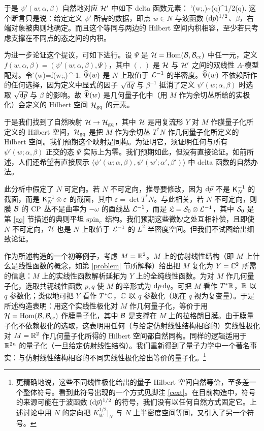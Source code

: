 于是 $\psi'(w;\alpha,\beta)$ 自然地对应 ${\mathcal H}'$ 中如下 delta 函数元素：
\be\label{wacko}\psi'(w;\alpha,\beta)\sim(\d\vec q)^{1/2}\delta(\vec q)\cdot\beta.\ee
这个断言只是说：给定定义 $\psi'$ 所需的数据，即点 $w\in N$ 与波函数 $({\mathrm d}\vec p)^{1/2}$、$\beta$，右端对象被典则地确定。而且这个等同与两边的 Hilbert 空间内积相容，至少若只考虑支撑在不同点的态之间的内积。

为进一步论证这个提议，可如下进行。设 $\Psi$ 是 ${\mathcal H}={\mathrm{Hom}}({\mathcal B},{\mathcal B}_{\mathrm{cc}})$ 中任一元，定义 $f(w,\alpha,\beta)=(\psi'(w;\alpha,\beta),\Psi)$，其中 $(\,,\,)$ 是 ${\mathcal H}$ 与 ${\mathcal H}'$ 之间的双线性 $A$-模型配对。令
\be\label{oko}\h\Psi(w)=f(w;\alpha,\beta)\,\beta^{-1}.\ee
$\widehat\Psi(w)$ 是 $N$ 上取值于 ${\mathcal L}^{-1}$ 的半密度。$\widehat\Psi(w)$ 不依赖所作的任何选择，因为定义中显式的因子 $\sqrt{{\mathrm d}\vec q}$ 与 $\beta^{-1}$ 抵消了定义 $\psi'(w;\alpha,\beta)$ 时选取 $\sqrt{{\mathrm d}\vec p}$ 与 $\beta$ 的影响。故 $\widehat\Psi(w)$ 是几何量子化中（用 $M$ 作为余切丛所给的实极化）会定义的 Hilbert 空间 ${\mathcal H}_{\mathrm{gq}}$ 的元素。

于是我们找到了自然映射 ${\mathcal H}\to{\mathcal H}_{\mathrm{gq}}$，其中 ${\mathcal H}$ 是用复流形 $Y$ 对 $M$ 作膜量子化所定义的 Hilbert 空间，${\mathcal H}_{\mathrm{gq}}$ 是把 $M$ 作为余切丛 $T^*N$ 作几何量子化所定义的 Hilbert 空间。我们预期这个映射是同构。为证明它，须证明任何与所有 $\psi'(w;\alpha,\beta)$ 正交的态 $\Psi$ 实际上为零。我们预期如此，但没有直接论证。如前所述，人们还希望有直接展示 $\langle\psi'(w;\alpha,\beta),\psi'(w';\alpha',\beta')\rangle$ 中 delta 函数的自然办法。

此分析中假定了 $N$ 可定向。若 $N$ 不可定向，推导要修改，因为 ${\mathrm d}\vec p$ 不是 ${\sf K}_N^{-1}$ 的截面，而是 ${\sf K}_N^{-1}\otimes\varepsilon$ 的截面，其中 $\varepsilon=\det T^*N$。与此相关，若 $N$ 不可定向，则膜 ${\mathcal B}$ 的 ${\mathrm{CP}}$ 丛不是曲率为 $-\omega$ 的酉线丛 ${\mathcal L}^{-1}$，而是 ${\mathfrak L}={\mathcal S}_0\otimes{\mathcal L}^{-1}$，其中 ${\mathcal S}_0$ 是第 \ref{gq} 节描述的典则平坦 ${\mathrm{spin}_c}$ 结构。我们预期这些微妙之处互相补偿，且即使 $N$ 不可定向，${\mathcal H}$ 也是 $N$ 上取值于 ${\mathcal L}^{-1}$ 的 $L^2$ 半密度空间。但我们不试图给出细致论证。

作为所述构造的一个初等例子，考虑 $M={\mathbb R}^2$。$M$ 上的仿射线性结构（即 $M$ 上什么是线性函数的概念，如第 \ref{problem} 节所解释）给出把 $M$ 复化为 $Y={\mathbb C}^2$ 所需的信息：$M$ 上的实线性函数解析延拓为 $Y$ 上的全纯线性函数。为对 $M$ 作几何量子化，选取共轭线性函数 $p,q$ 使 $M$ 的辛形式为 ${\mathrm d} p\,{\mathrm d} q$。可把 $M$ 看作 $T^*{\mathbb R}$，${\mathbb R}$ 以 $q$ 参数化；类似地可把 $Y$ 看作 $T^*{\mathbb C}$，${\mathbb C}$ 以 $q$ 参数化（现在 $q$ 视为复变量）。于是所述构造表明：用这个实线性极化对 $M$ 作几何量子化，等价于用 ${\mathcal H}={\mathrm{Hom}}({\mathcal B},{\mathcal B}_{\mathrm{cc}})$ 作膜量子化，其中 ${\mathcal B}$ 是支撑在 $M$ 上的拉格朗日膜。由于膜量子化不依赖极化的选取，这表明用任何（与给定仿射线性结构相容的）实线性极化对 $M={\mathbb R}^2$ 作几何量子化所得的 Hilbert 空间都自然同构。同样的逻辑适用于 ${\mathbb R}^{2n}$ 的量子化（一旦给定仿射线性结构）。我们重新得到了量子力学中一个著名事实：与仿射线性结构相容的不同实线性极化给出等价的量子化。\footnote{\label{maybe}更精确地说，这些不同线性极化给出的量子 Hilbert 空间自然等价，至多差一个整体符号。看到此符号出现的一个方式见脚注 \ref{cext}。在目前构造中，符号的来源可能在于波函数 $({\mathrm d}\vec p)^{1/2}$ 的符号，我们没有以任何自然方式固定它。上述讨论中用 $N$ 的定向把 $K_W^{1/2}|_N$ 与 $N$ 上半密度空间等同，又引入了另一个符号。}
